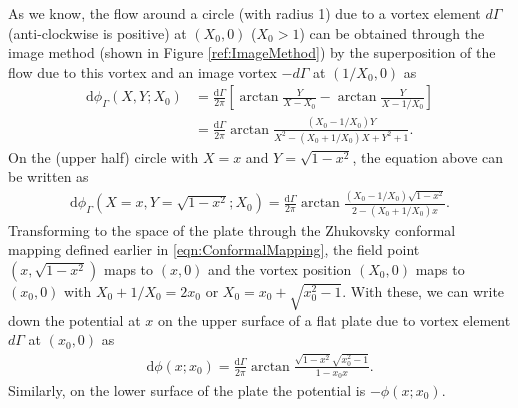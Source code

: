 As we know, the flow around a circle (with radius 1) due to a vortex element $d\Gamma$ (anti-clockwise is positive) at $(X_0, 0)$ ($X_0 > 1$) can be obtained through the image method (shown in Figure \ref{ref:ImageMethod}) by the superposition of the flow due to this vortex and an image vortex $-d\Gamma$ at $(1/X_0,0)$ as
\begin{align}
\mathrm{d}\phi_\Gamma (X,Y; X_0) & = \frac{\mathrm{d}\Gamma}{2\pi}[\arctan \frac{Y}{X-X_0} - \arctan \frac{Y}{X-1/X_0}]  \\
            & =  \frac{\mathrm{d}\Gamma}{2\pi}\arctan \frac{(X_0-1/X_0)Y}{X^2-(X_0+1/X_0)X+Y^2+1}.
\end{align}
On the (upper half) circle with $X = x$ and $Y = \sqrt{1-x^2}$, the equation above can be written as
\begin{align}
\mathrm{d}\phi_\Gamma (X = x,Y = \sqrt{1-x^2}; X_0)  =  \frac{\mathrm{d}\Gamma}{2\pi}\arctan \frac{(X_0-1/X_0)\sqrt{1-x^2}}{2-(X_0+1/X_0)x}.
\end{align}
Transforming to the space of the plate through the Zhukovsky conformal mapping defined earlier in \eqref{eqn:ConformalMapping}, the field point $(x, \sqrt{1-x^2})$ maps to $(x, 0)$ and the vortex position $(X_0, 0)$ maps to $(x_0, 0)$ with $X_0 + 1/X_0 = 2x_0$ or $X_0 = x_0 + \sqrt{x_0^2-1}$.
With these, we can write down the potential at $x$ on the upper surface of a flat plate due to vortex element $d\Gamma$ at $(x_0, 0)$ as
\begin{align}
\mathrm{d}\phi (x; x_0) = \frac{\mathrm{d}\Gamma}{2\pi} \arctan \frac{\sqrt{1-x^2}\sqrt{x_0^2-1}}{1-x_0x}.
\end{align}
Similarly, on the lower surface of the plate the potential is $-\phi(x; x_0)$.

